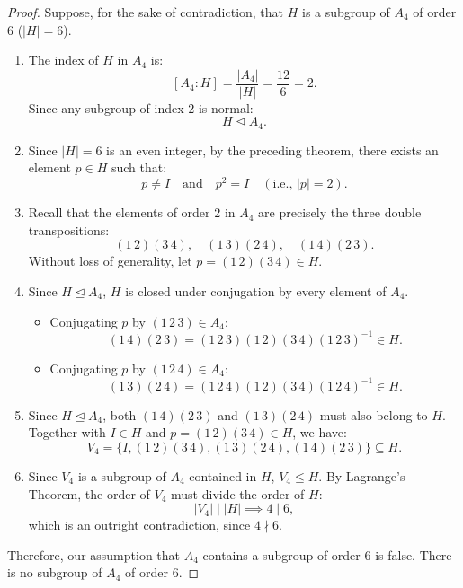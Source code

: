 \documentclass[12pt]{article}
\theoremstyle{definition}
\theoremstyle{plain}
\begin{document}
\begin{proof}
Suppose, for the sake of contradiction, that $H$ is a subgroup of $A_4$ of order 6 ($|H| = 6$).
\begin{enumerate}
    \item The index of $H$ in $A_4$ is:
    \[
    [A_4 : H] = \frac{|A_4|}{|H|} = \frac{12}{6} = 2.
    \]
    Since any subgroup of index 2 is normal:
    \[
    H \trianglelefteq A_4.
    \]
    
    \item Since $|H| = 6$ is an even integer, by the preceding theorem, there exists an element $p \in H$ such that:
    \[
    p \neq I \quad \text{and} \quad p^2 = I \quad (\text{i.e., } |p| = 2).
    \]
    
    \item Recall that the elements of order 2 in $A_4$ are precisely the three double transpositions:
    \[
    (1\,2)(3\,4), \quad (1\,3)(2\,4), \quad (1\,4)(2\,3).
    \]
    Without loss of generality, let $p = (1\,2)(3\,4) \in H$.
    
    \item Since $H \trianglelefteq A_4$, $H$ is closed under conjugation by every element of $A_4$.
    \begin{itemize}
        \item Conjugating $p$ by $(1\,2\,3) \in A_4$:
        \[
        (1\,4)(2\,3) = (1\,2\,3)(1\,2)(3\,4)(1\,2\,3)^{-1} \in H.
        \]
        \item Conjugating $p$ by $(1\,2\,4) \in A_4$:
        \[
        (1\,3)(2\,4) = (1\,2\,4)(1\,2)(3\,4)(1\,2\,4)^{-1} \in H.
        \]
    \end{itemize}
    
    \item Since $H \trianglelefteq A_4$, both $(1\,4)(2\,3)$ and $(1\,3)(2\,4)$ must also belong to $H$.
    Together with $I \in H$ and $p = (1\,2)(3\,4) \in H$, we have:
    \[
    V_4 = \{ I, (1\,2)(3\,4), (1\,3)(2\,4), (1\,4)(2\,3) \} \subseteq H.
    \]
    
    \item Since $V_4$ is a subgroup of $A_4$ contained in $H$, $V_4 \le H$.
    By Lagrange's Theorem, the order of $V_4$ must divide the order of $H$:
    \[
    |V_4| \mid |H| \implies 4 \mid 6,
    \]
    which is an outright contradiction, since $4 \nmid 6$.
\end{enumerate}
Therefore, our assumption that $A_4$ contains a subgroup of order 6 is false.
There is no subgroup of $A_4$ of order 6.
\end{proof}
\end{document}
